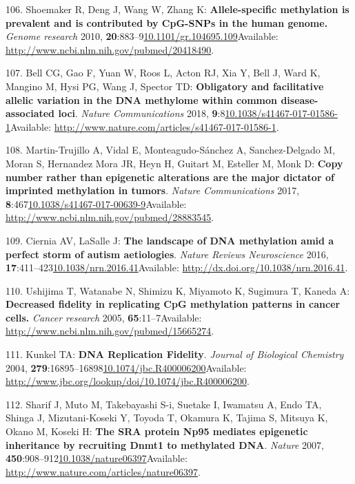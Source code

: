 \documentclass[
]{book}
\begin{document}
\leavevmode\hypertarget{ref-Shoemaker2010}{}%
106. Shoemaker R, Deng J, Wang W, Zhang K: \textbf{Allele-specific methylation is prevalent and is contributed by CpG-SNPs in the human genome.} \emph{Genome research} 2010, \textbf{20}:883--9\href{https://doi.org/10.1101/gr.104695.109}{10.1101/gr.104695.109}Available: \url{http://www.ncbi.nlm.nih.gov/pubmed/20418490}.

\leavevmode\hypertarget{ref-Bell2017a}{}%
107. Bell CG, Gao F, Yuan W, Roos L, Acton RJ, Xia Y, Bell J, Ward K, Mangino M, Hysi PG, Wang J, Spector TD: \textbf{Obligatory and facilitative allelic variation in the DNA methylome within common disease-associated loci}. \emph{Nature Communications} 2018, \textbf{9}:8\href{https://doi.org/10.1038/s41467-017-01586-1}{10.1038/s41467-017-01586-1}Available: \url{http://www.nature.com/articles/s41467-017-01586-1}.

\leavevmode\hypertarget{ref-Martin-Trujillo2017}{}%
108. Martin-Trujillo A, Vidal E, Monteagudo-Sánchez A, Sanchez-Delgado M, Moran S, Hernandez Mora JR, Heyn H, Guitart M, Esteller M, Monk D: \textbf{Copy number rather than epigenetic alterations are the major dictator of imprinted methylation in tumors}. \emph{Nature Communications} 2017, \textbf{8}:467\href{https://doi.org/10.1038/s41467-017-00639-9}{10.1038/s41467-017-00639-9}Available: \url{http://www.ncbi.nlm.nih.gov/pubmed/28883545}.

\leavevmode\hypertarget{ref-Ciernia2016}{}%
109. Ciernia AV, LaSalle J: \textbf{The landscape of DNA methylation amid a perfect storm of autism aetiologies}. \emph{Nature Reviews Neuroscience} 2016, \textbf{17}:411--423\href{https://doi.org/10.1038/nrn.2016.41}{10.1038/nrn.2016.41}Available: \url{http://dx.doi.org/10.1038/nrn.2016.41}.

\leavevmode\hypertarget{ref-Ushijima2005}{}%
110. Ushijima T, Watanabe N, Shimizu K, Miyamoto K, Sugimura T, Kaneda A: \textbf{Decreased fidelity in replicating CpG methylation patterns in cancer cells.} \emph{Cancer research} 2005, \textbf{65}:11--7Available: \url{http://www.ncbi.nlm.nih.gov/pubmed/15665274}.

\leavevmode\hypertarget{ref-Kunkel2004a}{}%
111. Kunkel TA: \textbf{DNA Replication Fidelity}. \emph{Journal of Biological Chemistry} 2004, \textbf{279}:16895--16898\href{https://doi.org/10.1074/jbc.R400006200}{10.1074/jbc.R400006200}Available: \url{http://www.jbc.org/lookup/doi/10.1074/jbc.R400006200}.

\leavevmode\hypertarget{ref-Sharif2007}{}%
112. Sharif J, Muto M, Takebayashi S-i, Suetake I, Iwamatsu A, Endo TA, Shinga J, Mizutani-Koseki Y, Toyoda T, Okamura K, Tajima S, Mitsuya K, Okano M, Koseki H: \textbf{The SRA protein Np95 mediates epigenetic inheritance by recruiting Dnmt1 to methylated DNA}. \emph{Nature} 2007, \textbf{450}:908--912\href{https://doi.org/10.1038/nature06397}{10.1038/nature06397}Available: \url{http://www.nature.com/articles/nature06397}.
\end{document}

